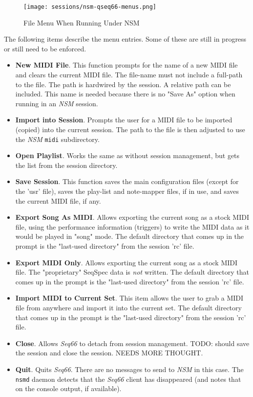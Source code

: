 \begin{figure}[H]
   \centering 
   \texttt{[image: sessions/nsm-qseq66-menus.png]}
   \caption*{File Menu When Running Under NSM}
\end{figure}

   The following items describe the menu entries.  Some of these are still in
   progress or still need to be enforced.

   \begin{itemize}
      \item \textbf{New MIDI File}.
         This function prompts for the name of a
         new MIDI file and clears the current MIDI file.  The file-name must not
         include a full-path to the file.  The path is hardwired by the
         session.  A relative path can be included.  This name is needed
         because there is no "Save As" option when running in an \textsl{NSM}
         session.
      \item \textbf{Import into Session}.
         Prompts the user for a MIDI file to
         be imported (copied) into the current session.  The path to the file
         is then adjusted to use the \textsl{NSM} \texttt{midi} subdirectory.
      \item \textbf{Open Playlist}.
         Works the same as without session
         management, but gets the list from the session directory.
      \item \textbf{Save Session}.
         This function saves the main configuration
         files (except for the 'usr' file), saves the play-list and note-mapper
         files, if in use, and saves the current MIDI file, if any.
      \item \textbf{Export Song As MIDI}.
         Allows exporting the current song as a stock MIDI file, using the
         performance information (triggers) to write the MIDI data as it would
         be played in "song" mode.
         The default directory that comes up in the
         prompt is the "last-used directory" from the session 'rc' file.
      \item \textbf{Export MIDI Only}.
         Allows exporting the current song as a stock MIDI file.
         The "proprietary" SeqSpec data is \textsl{not} written.
         The default directory that comes up in the
         prompt is the "last-used directory" from the session 'rc' file.
      \item \textbf{Import MIDI to Current Set}.
         This item allows the user to grab a MIDI file from anywhere and import
         it into the current set.
         The default directory that comes up in the
         prompt is the "last-used directory" from the session 'rc' file.
      \item \textbf{Close}.
         Allows \textsl{Seq66} to detach from session management.
         TODO:  should save the session and close the session.
         NEEDS MORE THOUGHT.
      \item \textbf{Quit}.
         Quits \textsl{Seq66}.
         There are no messages to send to \textsl{NSM} in this case.
         The \texttt{nsmd} daemon detects that the \textsl{Seq66} client has
         disappeared (and notes that on the console output, if available).
   \end{itemize}

